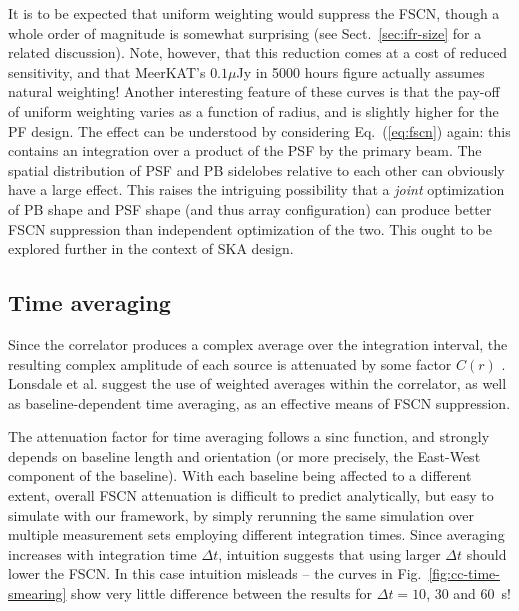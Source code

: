 \documentclass{aa}
\begin{document}
It is to be expected that uniform weighting would suppress the FSCN, though a whole order of magnitude is somewhat surprising (see Sect.~\ref{sec:ifr-size} for a related discussion). Note, however, that this reduction comes at a cost of reduced sensitivity, and that MeerKAT's $0.1\mu$Jy in 5000 hours figure actually assumes natural weighting! Another interesting feature of these curves is that the pay-off of uniform weighting varies as a function of radius, and is slightly higher for the PF design. The effect can be understood by considering  Eq.~(\ref{eq:fscn}) again: this contains an integration over a product of the PSF by the primary beam. The spatial distribution of PSF and PB sidelobes relative to each other can obviously have a large effect. This raises the intriguing possibility that a \emph{joint} optimization of PB shape and PSF shape (and thus array configuration) can produce better FSCN suppression than independent optimization of the two. This ought to be explored further in the context of SKA design.

\subsection{Time averaging}
\label{sec:smearing}

Since the correlator produces a complex average over the integration interval, the resulting complex amplitude of each source is attenuated by some factor $C(r)$ \citep[see Eq.~(\ref{eq:fscn}) above, and also Fig.~2 of][]{SKA54-expa,SKA54}. Lonsdale et al. suggest the use of weighted averages within the correlator, as well as baseline-dependent time averaging, as an effective means of FSCN suppression.

The attenuation factor for time averaging follows a sinc function, and strongly depends on baseline length and orientation (or more precisely, the East-West component of the baseline). With each baseline being affected to a different extent, overall FSCN attenuation is difficult to predict analytically, but easy to simulate with our framework, by simply rerunning the same simulation over multiple measurement sets employing different integration times. Since averaging increases with integration time $\Delta t$, intuition suggests that using larger $\Delta t$ should lower the FSCN. In this case intuition misleads -- the curves in Fig.~\ref{fig:cc-time-smearing} show very little difference between the results for $\Delta t=10$, 30 and 60~s!
\end{document}
